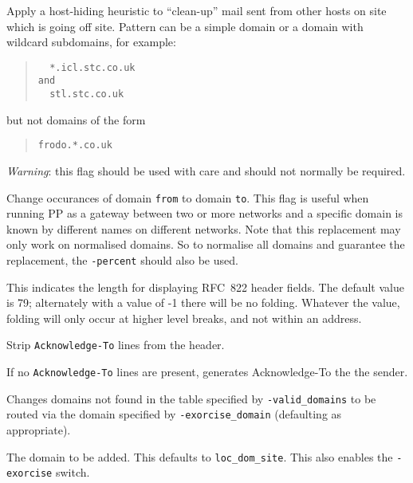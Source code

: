 \begin{describe}
\item[\verb+-hidelocal <pattern>+:] Apply a host-hiding heuristic to
``clean-up'' mail sent from other hosts on site which is going off site.
Pattern can be a simple domain or a domain with wildcard subdomains,
for example:
\begin{quote}\small\begin{verbatim}
  *.icl.stc.co.uk
and
  stl.stc.co.uk
\end{verbatim}\end{quote}
but not domains of the form
\begin{quote}\begin{verbatim}
frodo.*.co.uk
\end{verbatim}\end{quote}

{\em Warning}: this flag should be used with care and should not normally be
required.

\item[\verb+-changedomain <from> <to>+:] Change occurances of domain
\verb+from+ to domain \verb+to+. This flag is useful when running PP
as a gateway between two or more networks and a specific domain is
known by different names on different networks.
Note that this replacement may only work on normalised domains.
So to normalise all domains and guarantee the replacement, the
\verb+-percent+ should also be used.
 
\item[\verb+-fold <number>+:] This indicates the length for displaying 
RFC~822 header fields. 
The default value is 79; alternately with a value of -1 there will be 
no folding. Whatever the value, folding will only occur at higher level
breaks, and not within an address. 

\item[\verb|-stripack|:] Strip \verb|Acknowledge-To| lines from the header.

\item[\verb|-acks|:] If no \verb|Acknowledge-To| lines are present, generates
Acknowledge-To the the sender.

\item[\verb|-exorcise|:] Changes domains not found in the table
specified by \verb|-valid_domains| to be routed via the domain
specified by \verb|-exorcise_domain| (defaulting as appropriate).

\item[\verb|-exorcise\_domain domain|:] The domain to be added. This defaults
to \verb|loc_dom_site|. This also enables the \verb|-exorcise| switch.


\end{describe}
